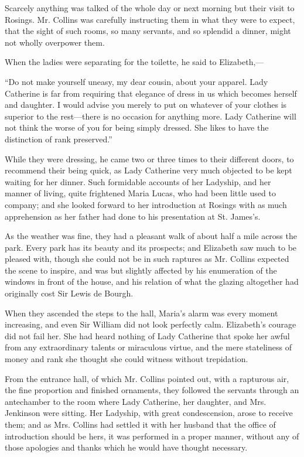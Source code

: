 Scarcely anything was talked of the whole day or next morning but their visit to Rosings. Mr. Collins was carefully instructing them in what they were to expect, that the sight of such rooms, so many servants, and so splendid a dinner, might not wholly overpower them.

When the ladies were separating for the toilette, he said to Elizabeth,---

``Do not make yourself uneasy, my dear cousin, about your apparel. Lady Catherine is far from requiring that elegance of dress in us which becomes herself and daughter. I would advise you merely to put on whatever of your clothes is superior to the rest---there is no occasion for anything more. Lady Catherine will not think the worse of you for being simply dressed. She likes to have the distinction of rank preserved.''

While they were dressing, he came two or three times to their different doors, to recommend their being quick, as Lady Catherine very much objected to be kept waiting for her dinner. Such formidable accounts of her Ladyship, and her manner of living, quite frightened Maria Lucas, who had been little used to company; and she looked forward to her introduction at Rosings with as much apprehension as her father had done to his presentation at St. James's.

As the weather was fine, they had a pleasant walk of about half a mile across the park. Every park has its beauty and its prospects; and Elizabeth saw much to be pleased with, though she could not be in such raptures as Mr. Collins expected the scene to inspire, and was but slightly affected by his enumeration of the windows in front of the house, and his relation of what the glazing altogether had originally cost Sir Lewis de Bourgh.

When they ascended the steps to the hall, Maria's alarm was every moment increasing, and even Sir William did not look perfectly calm. Elizabeth's courage did not fail her. She had heard nothing of Lady Catherine that spoke her awful from any extraordinary talents or miraculous virtue, and the mere stateliness of money and rank she thought she could witness without trepidation.

From the entrance hall, of which Mr. Collins pointed out, with a rapturous air, the fine proportion and finished ornaments, they followed the servants through an antechamber to the room where Lady Catherine, her daughter, and Mrs. Jenkinson were sitting. Her Ladyship, with great condescension, arose to receive them; and as Mrs. Collins had settled it with her husband that the office of introduction should be hers, it was performed in a proper manner, without any of those apologies and thanks which he would have thought necessary.

